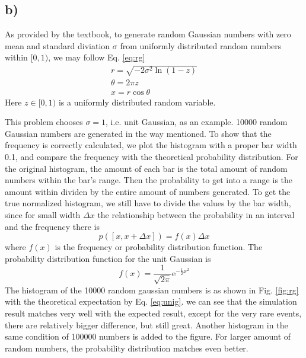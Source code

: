 \documentclass[12pt, graphicx]{article}
\begin{document}
\subsection*{b)}
As provided by the textbook, to generate random Gaussian numbers with zero mean and standard diviation $\sigma$ from uniformly distributed random numbers within $[0,1)$, we may follow Eq. \ref{eq:rg}
\begin{equation}
\begin{gathered}
r=\sqrt{-2\sigma^2\ln(1-z)}\\
\theta=2\pi z\\
x=r\cos\theta
\end{gathered}
\label{eq:rg}
\end{equation}
Here $z\in[0,1)$ is a uniformly distributed random variable.\par
This problem chooses $\sigma=1$, i.e. unit Gaussian, as an example. 10000 random Gaussian numbers are generated in the way mentioned. To show that the frequency is correctly calculated, we plot the histogram with a proper bar width 0.1, and compare the frequency with the theoretical probability distribution. For the original histogram, the amount of each bar is the total amount of random numbers within the bar's range. Then the probability to get into a range is the amount within dividen by the entire amount of numbers generated. To get the true normalized histogram, we still have to divide the values by the bar width, since for small width $\Delta x$ the relationship between the probability in an interval and the frequency there is
\begin{equation}
p([x,x+\Delta x])=f(x)\Delta x
\end{equation}
where $f(x)$ is the frequency or probability distribution function. The probability distribution function for the unit Gaussian is
\begin{equation}
f(x)=\frac{1}{\sqrt{2\pi}}\mathrm{e}^{-\frac{1}{2}x^2}
\label{eq:unig}
\end{equation}
The histogram of the 10000 random gaussian numbers is as shown in Fig. \ref{fig:rg} with the theoretical expectation by Eq. \ref{eq:unig}. we can see that the simulation result matches very well with the expected result, except for the very rare events, there are relatively bigger difference, but still great. Another histogram in the same condition of 100000 numbers is added to the figure. For larger amount of random numbers, the probability distribution matches even better. 
\end{document}
